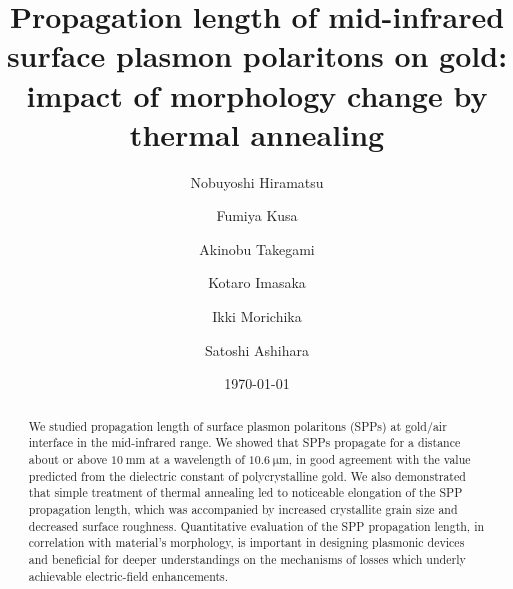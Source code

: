 \documentclass[aip,apl,reprint]{revtex4-1}
\begin{document}
\title{Propagation length of mid-infrared surface plasmon polaritons on gold: impact of morphology change by thermal annealing}
\author{Nobuyoshi Hiramatsu}
\author{Fumiya Kusa}
\author{Akinobu Takegami}
\author{Kotaro Imasaka}
\author{Ikki Morichika}
\author{Satoshi Ashihara}

\date{\today}

\begin{abstract}
We studied propagation length of surface plasmon polaritons (SPPs) at gold/air interface in the mid-infrared range. We showed that SPPs propagate for a distance about or above $10\:\mathrm{mm}$ at a wavelength of $10.6\:\mathrm{\mu m}$, in good agreement with the value predicted from the dielectric constant of polycrystalline gold. We also demonstrated that simple treatment of thermal annealing led to noticeable elongation of the SPP propagation length, which was accompanied by increased crystallite grain size and decreased surface roughness. Quantitative evaluation of the SPP propagation length, in correlation with material's morphology, is important in designing plasmonic devices and beneficial for deeper understandings on the mechanisms of losses which underly achievable electric-field enhancements.
\end{abstract}

\maketitle
 
\end{document}

